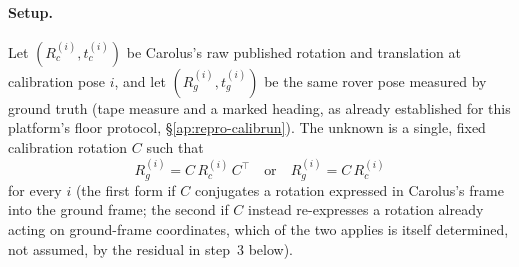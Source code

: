 \paragraph{Setup.} Let $(R_c^{(i)}, t_c^{(i)})$ be Carolus's raw published
rotation and translation at calibration pose $i$, and let $(R_g^{(i)},
t_g^{(i)})$ be the same rover pose measured by ground truth (tape measure and
a marked heading, as already established for this platform's floor protocol,
\S\ref{ap:repro-calibrun}). The unknown is a single, fixed calibration
rotation $C$ such that
\begin{equation}
R_g^{(i)} = C\, R_c^{(i)}\, C^\top \quad\text{or}\quad R_g^{(i)} = C\, R_c^{(i)}
\label{eq:calibgeneral}
\end{equation}
for every $i$ (the first form if $C$ conjugates a rotation expressed in
Carolus's frame into the ground frame; the second if $C$ instead re-expresses
a rotation already acting on ground-frame coordinates, which of the two
applies is itself determined, not assumed, by the residual in step~3 below).

